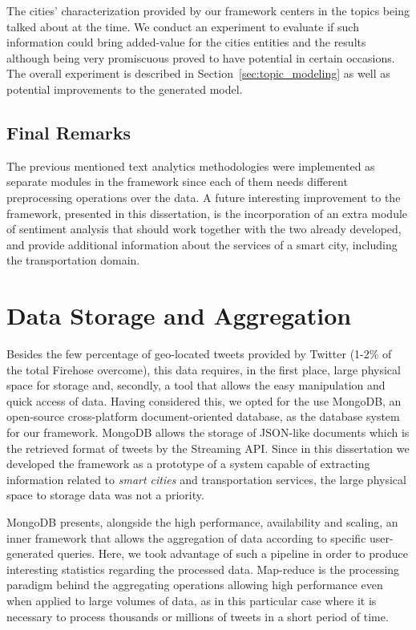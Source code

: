 The cities' characterization provided by our framework centers in the topics being talked about at the time. We conduct an experiment to evaluate if such information could bring added-value for the cities entities and the results although being very promiscuous proved to have potential in certain occasions. The overall experiment is described in Section~\ref{sec:topic_modeling} as well as potential improvements to the generated model.

\subsection{Final Remarks}

The previous mentioned text analytics methodologies were implemented as separate modules in the framework since each of them needs different preprocessing operations over the data. A future interesting improvement to the framework, presented in this dissertation, is the incorporation of an extra module of sentiment analysis that should work together with the two already developed, and provide additional information about the services of a smart city, including the transportation domain.

\section{Data Storage and Aggregation}\label{sec:storage_aggregations}

Besides the few percentage of geo-located tweets provided by Twitter (1-2\% of the total Firehose overcome), this data requires, in the first place, large physical space for storage and, secondly, a tool that allows the easy manipulation and quick access of data. Having considered this, we opted for the use MongoDB, an open-source cross-platform document-oriented database, as the database system for our framework. MongoDB allows the storage of JSON-like documents which is the retrieved format of tweets by the Streaming API. Since in this dissertation we developed the framework as a prototype of a system capable of extracting information related to \textit{smart cities} and transportation services, the large physical space to storage data was not a priority.

MongoDB presents, alongside the high performance, availability and scaling, an inner framework that allows the aggregation of data according to specific user-generated queries. Here, we took advantage of such a pipeline in order to produce interesting statistics regarding the processed data. Map-reduce is the processing paradigm behind the aggregating operations allowing high performance even when applied to large volumes of data, as in this particular case where it is necessary to process thousands or millions of tweets in a short period of time.

